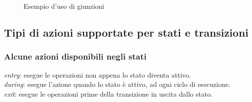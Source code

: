 \documentclass{article}
\begin{document}
                \begin{figure} [ht]
                    \caption{Esempio d'uso di giunzioni}
                    \label{fig:joint}
                \end{figure}

            
        \subsection{Tipi di azioni supportate per stati e transizioni}

            \subsubsection{Alcune azioni disponibili negli stati}

                \emph{entry}: esegue le operazioni non appena lo stato diventa attivo.\\
                \emph{during}: esegue l’azione quando lo stato è attivo, ad ogni ciclo di esecuzione.\\
                \emph{exit}: esegue le operazioni prime della transizione in uscita dallo stato.\\
\end{document}
